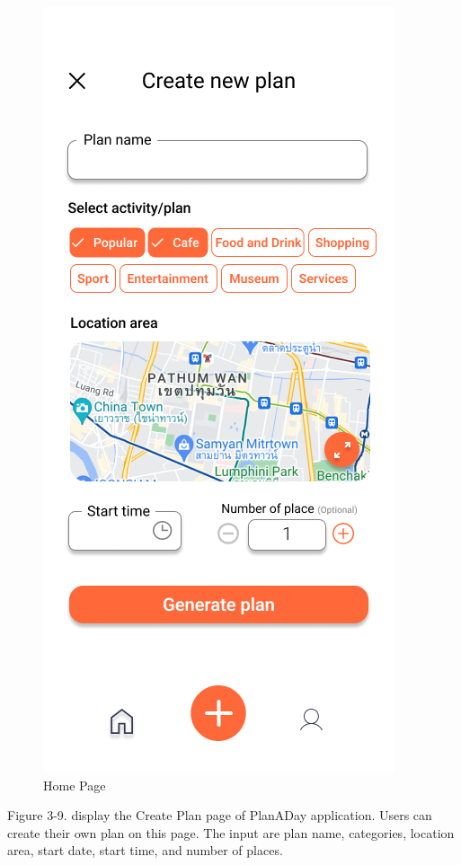 \newpage
\begin{figure}[!h]
    \centering
    \includegraphics[width=0.5\linewidth]{chapter3/UI_Create_plan.png}
    \caption{Home Page}
    \label{fig:Home Page}
\end{figure}
\noindent
Figure 3-9. display the Create Plan page of PlanADay application. Users can create
their own plan on this page. The input are plan name, categories, location area, start
date, start time, and number of places.

